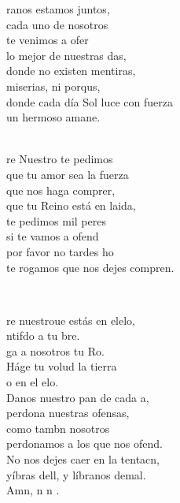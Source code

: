 \documentclass[12pt]{article}
\begin{document}
\begin{multicols*}{2}
\begin{cancion}%
	ranos estamos juntos,\\
cada uno de nosotros \\
	te venimos a ofer\\
	lo mejor de nuestras das,\\
donde no existen mentiras, \\
	miserias, ni porqus,\\
	donde cada día Sol luce con fuerza\\
	un hermoso amane.\\\jump\\
	\begin{chorus}%
	re Nuestro te pedimos\\
que tu amor sea la fuerza\\
	que nos haga comprer,\\
	que tu Reino está en laida,\\
	te pedimos mil peres\\
	si te vamos a ofend\\
	por favor no tardes ho \\
	te rogamos que nos dejes compren.\\
	\end{chorus}%
	\jump\\
\end{cancion}%

\begin{cancion}%
	re nuestroue estás en elelo,\\
	ntifdo a tu bre.\\
	ga a nosotros tu Ro.\\
	Háge tu volud la tierra \\
	o en el elo.\\
	Danos  nuestro pan de cada a, \\
perdona nuestras ofensas, \\
	como tambn nosotros\\
	perdonamos a los que nos ofend.\\
	No nos dejes caer en la tentacn,\\
	yíbras dell, y líbranos demal.\\
	Amn, n n .  \\
\end{cancion}%


\end{multicols*}
\end{document}
